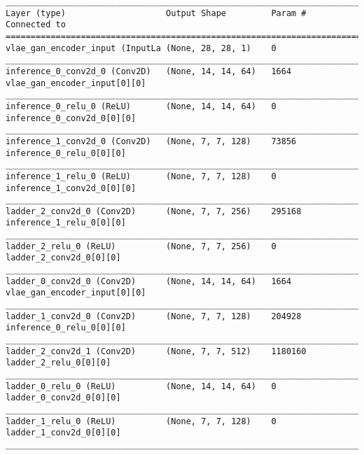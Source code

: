 \begin{lstlisting}[caption={\textsc{Mnist}-VLAE-GAN Encoder},captionpos=b,basicstyle=\tiny, label={lst:mnist-vlae-gan-encoder}]
__________________________________________________________________________________________________
Layer (type)                    Output Shape         Param #     Connected to
==================================================================================================
vlae_gan_encoder_input (InputLa (None, 28, 28, 1)    0
__________________________________________________________________________________________________
inference_0_conv2d_0 (Conv2D)   (None, 14, 14, 64)   1664        vlae_gan_encoder_input[0][0]
__________________________________________________________________________________________________
inference_0_relu_0 (ReLU)       (None, 14, 14, 64)   0           inference_0_conv2d_0[0][0]
__________________________________________________________________________________________________
inference_1_conv2d_0 (Conv2D)   (None, 7, 7, 128)    73856       inference_0_relu_0[0][0]
__________________________________________________________________________________________________
inference_1_relu_0 (ReLU)       (None, 7, 7, 128)    0           inference_1_conv2d_0[0][0]
__________________________________________________________________________________________________
ladder_2_conv2d_0 (Conv2D)      (None, 7, 7, 256)    295168      inference_1_relu_0[0][0]
__________________________________________________________________________________________________
ladder_2_relu_0 (ReLU)          (None, 7, 7, 256)    0           ladder_2_conv2d_0[0][0]
__________________________________________________________________________________________________
ladder_0_conv2d_0 (Conv2D)      (None, 14, 14, 64)   1664        vlae_gan_encoder_input[0][0]
__________________________________________________________________________________________________
ladder_1_conv2d_0 (Conv2D)      (None, 7, 7, 128)    204928      inference_0_relu_0[0][0]
__________________________________________________________________________________________________
ladder_2_conv2d_1 (Conv2D)      (None, 7, 7, 512)    1180160     ladder_2_relu_0[0][0]
__________________________________________________________________________________________________
ladder_0_relu_0 (ReLU)          (None, 14, 14, 64)   0           ladder_0_conv2d_0[0][0]
__________________________________________________________________________________________________
ladder_1_relu_0 (ReLU)          (None, 7, 7, 128)    0           ladder_1_conv2d_0[0][0]
__________________________________________________________________________________________________

\end{lstlisting}
